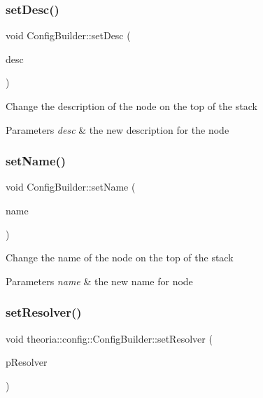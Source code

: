 \subsubsection{\texorpdfstring{set\+Desc()}{setDesc()}}
{\footnotesize\ttfamily void Config\+Builder\+::set\+Desc (\begin{DoxyParamCaption}\item[{const std\+::string \&}]{desc }\end{DoxyParamCaption})}

Change the description of the node on the top of the stack 
\begin{DoxyParams}{Parameters}
{\em desc} & the new description for the node \\
\hline
\end{DoxyParams}
\mbox{\label{classtheoria_1_1config_1_1ConfigBuilder_a19eea792ee2bc01c44806d2a5a9f666c}} 
\subsubsection{\texorpdfstring{set\+Name()}{setName()}}
{\footnotesize\ttfamily void Config\+Builder\+::set\+Name (\begin{DoxyParamCaption}\item[{const std\+::string \&}]{name }\end{DoxyParamCaption})}

Change the name of the node on the top of the stack 
\begin{DoxyParams}{Parameters}
{\em name} & the new name for node \\
\hline
\end{DoxyParams}
\mbox{\label{classtheoria_1_1config_1_1ConfigBuilder_aff25e4ada86baf419820b610a4707cbe}} 
\subsubsection{\texorpdfstring{set\+Resolver()}{setResolver()}}
{\footnotesize\ttfamily void theoria\+::config\+::\+Config\+Builder\+::set\+Resolver (\begin{DoxyParamCaption}\item[{\hyperlink{classtheoria_1_1config_1_1ConfigVariableResolver}{Config\+Variable\+Resolver} $\ast$}]{p\+Resolver }\end{DoxyParamCaption})\hspace{0.3cm}{\ttfamily [inline]}}

